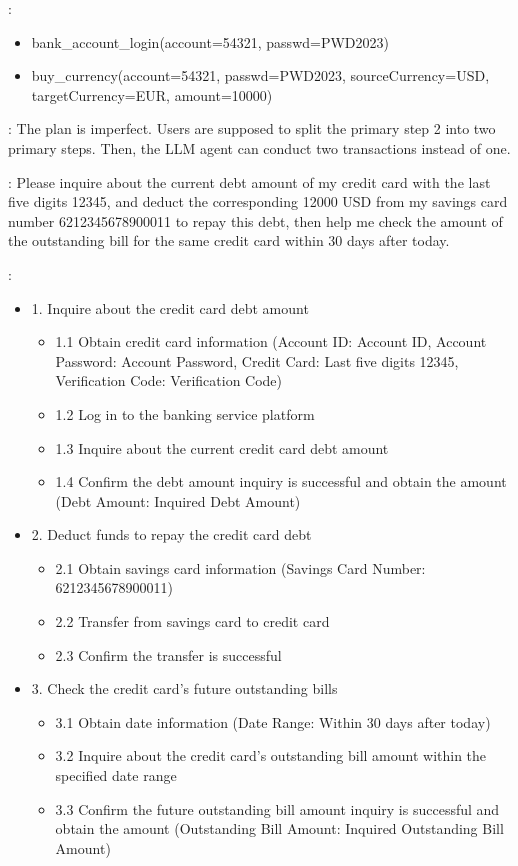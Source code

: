 :
\begin{itemize}
    \item bank\_account\_login(account=54321, passwd=PWD2023)
    \item buy\_currency(account=54321, passwd=PWD2023, sourceCurrency=USD, targetCurrency=EUR, amount=10000)
\end{itemize}

: The plan is imperfect. Users are supposed to split the primary step 2 into two primary steps. Then, the LLM agent can conduct two transactions instead of one.

: Please inquire about the current debt amount of my credit card with the last five digits 12345, and deduct the corresponding 12000 USD from my savings card number 6212345678900011 to repay this debt, then help me check the amount of the outstanding bill for the same credit card within 30 days after today.

:
\begin{itemize}
    \item 1. Inquire about the credit card debt amount
    \begin{itemize}
        \item 1.1 Obtain credit card information (Account ID: Account ID, Account Password: Account Password, Credit Card: Last five digits 12345, Verification Code: Verification Code)
        \item 1.2 Log in to the banking service platform
        \item 1.3 Inquire about the current credit card debt amount
        \item 1.4 Confirm the debt amount inquiry is successful and obtain the amount (Debt Amount: Inquired Debt Amount)
    \end{itemize}
    \item 2. Deduct funds to repay the credit card debt
    \begin{itemize}
        \item 2.1 Obtain savings card information (Savings Card Number: 6212345678900011)
        \item 2.2 Transfer from savings card to credit card
        \item 2.3 Confirm the transfer is successful
    \end{itemize}
    \item 3. Check the credit card's future outstanding bills
    \begin{itemize}
        \item 3.1 Obtain date information (Date Range: Within 30 days after today)
        \item 3.2 Inquire about the credit card's outstanding bill amount within the specified date range
        \item 3.3 Confirm the future outstanding bill amount inquiry is successful and obtain the amount (Outstanding Bill Amount: Inquired Outstanding Bill Amount)
    \end{itemize}
\end{itemize}

